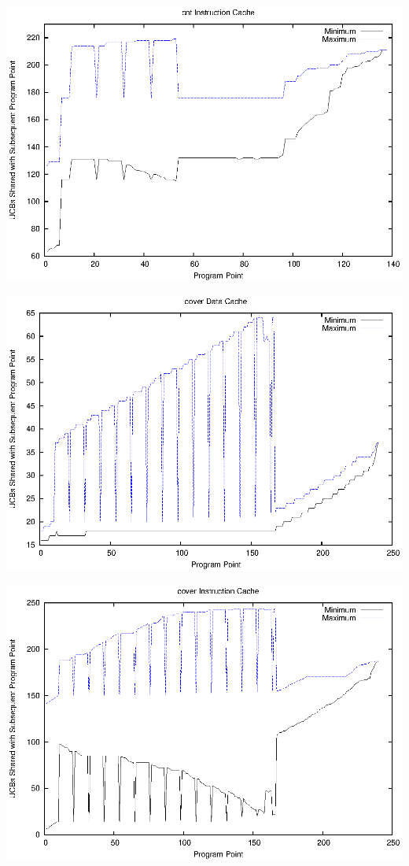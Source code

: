 \begin{center}
  \includegraphics[width=\linewidth]{eps/cnt-icache.eps}
\end{center}
\begin{center}
  \includegraphics[width=\linewidth]{eps/cover-dcache.eps}
\end{center}
\begin{center}
  \includegraphics[width=\linewidth]{eps/cover-icache.eps}
\end{center}
